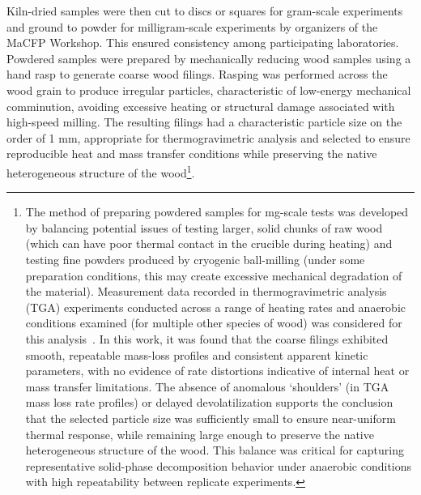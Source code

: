 \documentclass{book}
\begin{document}
Kiln-dried samples were then cut to discs or squares for gram-scale experiments and ground to powder for milligram-scale experiments by organizers of the MaCFP Workshop. This ensured consistency among participating laboratories. Powdered samples were prepared by mechanically reducing wood samples using a hand rasp to generate coarse wood filings. Rasping was performed across the wood grain to produce irregular particles, characteristic of low-energy mechanical comminution, avoiding excessive heating or structural damage associated with high-speed milling. The resulting filings had a characteristic particle size on the order of 1 mm, appropriate for thermogravimetric analysis and selected to ensure reproducible heat and mass transfer conditions while preserving the native heterogeneous structure of the wood\footnote{The method of preparing powdered samples for mg-scale tests was developed by balancing potential issues of testing larger, solid chunks of raw wood (which can have poor thermal contact in the crucible during heating) and testing fine powders produced by cryogenic ball-milling (under some preparation conditions, this may create excessive mechanical degradation of the material). Measurement data recorded in thermogravimetric analysis (TGA) experiments conducted across a range of heating rates and anaerobic conditions examined (for multiple other species of wood) was considered for this analysis~\cite{Bellamy2025Interflam}. In this work, it was found that the coarse filings exhibited smooth, repeatable mass-loss profiles and consistent apparent kinetic parameters, with no evidence of rate distortions indicative of internal heat or mass transfer limitations. The absence of anomalous `shoulders' (in TGA mass loss rate profiles) or delayed devolatilization supports the conclusion that the selected particle size was sufficiently small to ensure near-uniform thermal response, while remaining large enough to preserve the native heterogeneous structure of the wood. This balance was critical for capturing representative solid-phase decomposition behavior under anaerobic conditions with high repeatability between replicate experiments.}.
\end{document}
